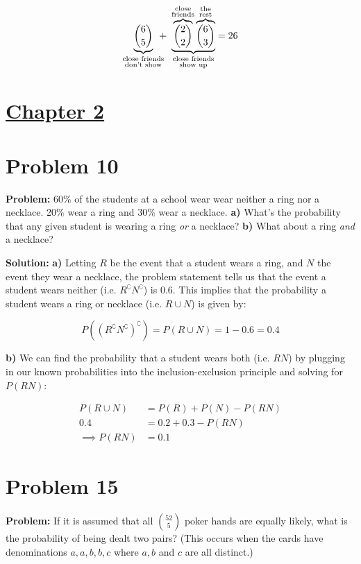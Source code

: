 \documentclass{article}
\begin{document}
\begin{equation*}
    \underbrace{\binom{6}{5}}_{\substack{\text{close friends}\\ \text{don't show}}}\mkern-12mu+\,\,\underbrace{\overbrace{\binom{2}{2}}^{\substack{\text{close}\\ \text{friends}}}\overbrace{\binom{6}{3}}^{\substack{\text{the}\\ \text{rest}}}}_{\substack{\text{close friends}\\ \text{show up}}}=26
\end{equation*}

\section*{\underline{Chapter 2}}
\section*{Problem 10}
\noindent\textbf{Problem:} 60\% of the students at a school wear wear neither a ring nor a necklace. 20\% wear a ring and 30\% wear a necklace. \textbf{a)} What's the probability that any given student is wearing a ring \textit{or} a necklace? \textbf{b)} What about a ring \textit{and} a necklace?
\bigskip

\noindent\textbf{Solution:} \textbf{a)} Letting $R$ be the event that a student wears a ring, and $N$ the event they wear a necklace, the problem statement tells us that the event a student wears neither (i.e. $R^\complement N^\complement$) is $0.6$. This implies that the probability a student wears a ring or necklace (i.e. $R\cup N$) is given by:

\begin{equation*}
    P((R^\complement N^\complement)^\complement)=P(R\cup N)=1-0.6=0.4
\end{equation*}

\textbf{b)} We can find the probability that a student wears both (i.e. $RN$) by plugging in our known probabilities into the inclusion-exclusion principle and solving for $P(RN)$:

\begin{align*}
    P(R\cup N)&=P(R)+P(N)-P(RN)\\
    0.4&=0.2+0.3-P(RN)\\
    \implies P(RN)&=0.1
\end{align*}

\section*{Problem 15}
\noindent\textbf{Problem:} If it is assumed that all $\binom{52}{5}$ poker hands are equally likely, what is the probability of being dealt two pairs? (This occurs when the cards have denominations $a,a,b,b,c$ where $a,b$ and $c$ are all distinct.)
\bigskip
\end{document}
